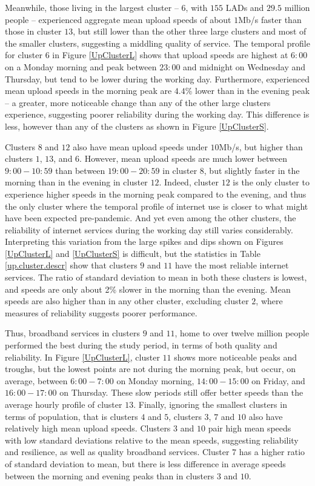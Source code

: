 \documentclass[Royal,times,sageh]{sagej}
\begin{document}
Meanwhile, those living in the largest cluster -- \(6\), with \(155\)
LADs and \(29.5\) million people -- experienced aggregate mean upload
speeds of about \(1\)Mb/s faster than those in cluster \(13\), but still
lower than the other three large clusters and most of the smaller
clusters, suggesting a middling quality of service. The temporal profile
for cluster \(6\) in Figure \ref{UpClusterL} shows that upload speeds
are highest at \(6:00\) on a Monday morning and peak between \(23:00\)
and midnight on Wednesday and Thursday, but tend to be lower during the
working day. Furthermore, experienced mean upload speeds in the morning
peak are \(4.4\)\% lower than in the evening peak -- a greater, more
noticeable change than any of the other large clusters experience,
suggesting poorer reliability during the working day. This difference is
less, however than any of the clusters as shown in Figure
\ref{UpClusterS}.

Clusters \(8\) and \(12\) also have mean upload speeds under \(10\)Mb/s,
but higher than clusters \(1\), \(13\), and \(6\). However, mean upload
speeds are much lower between \(9:00-10:59\) than between
\(19:00-20:59\) in cluster \(8\), but slightly faster in the morning
than in the evening in cluster \(12\). Indeed, cluster \(12\) is the
only cluster to experience higher speeds in the morning peak compared to
the evening, and thus the only cluster where the temporal profile of
internet use is closer to what might have been expected pre-pandemic.
And yet even among the other clusters, the reliability of internet
services during the working day still varies considerably. Interpreting
this variation from the large spikes and dips shown on Figures
\ref{UpClusterL} and \ref{UpClusterS} is difficult, but the statistics
in Table \ref{up.cluster.descr} show that clusters \(9\) and \(11\) have
the most reliable internet services. The ratio of standard deviation to
mean in both these clusters is lowest, and speeds are only about 2\%
slower in the morning than the evening. Mean speeds are also higher than
in any other cluster, excluding cluster \(2\), where measures of
reliability suggests poorer performance.

Thus, broadband services in clusters \(9\) and \(11\), home to over
twelve million people performed the best during the study period, in
terms of both quality and reliability. In Figure \ref{UpClusterL},
cluster \(11\) shows more noticeable peaks and troughs, but the lowest
points are not during the morning peak, but occur, on average, between
\(6:00-7:00\) on Monday morning, \(14:00-15:00\) on Friday, and
\(16:00-17:00\) on Thursday. These slow periods still offer better
speeds than the average hourly profile of cluster \(13\). Finally,
ignoring the smallest clusters in terms of population, that is clusters
\(4\) and \(5\), clusters \(3\), \(7\) and \(10\) also have relatively
high mean upload speeds. Clusters \(3\) and \(10\) pair high mean speeds
with low standard deviations relative to the mean speeds, suggesting
reliability and resilience, as well as quality broadband services.
Cluster \(7\) has a higher ratio of standard deviation to mean, but
there is less difference in average speeds between the morning and
evening peaks than in clusters \(3\) and \(10\).
\end{document}
